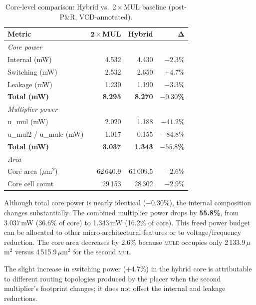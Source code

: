 \begin{table}[t]
  \caption{Core-level comparison: Hybrid vs.\ $2\!\times\!$MUL
           baseline (post-P\&R, VCD-annotated).}
  \label{tab:core_power}
  \centering
  \small
  \begin{tabular}{lrrr}
    \toprule
    \textbf{Metric} & $\boldsymbol{2\!\times\!}$\textbf{MUL} & \textbf{Hybrid} & $\boldsymbol{\Delta}$ \\
    \midrule
    \multicolumn{4}{l}{\emph{Core power}} \\
    \quad Internal (mW)  & 4.532 & 4.430 & $-2.3$\% \\
    \quad Switching (mW) & 2.532 & 2.650 & $+4.7$\% \\
    \quad Leakage (mW)   & 1.230 & 1.190 & $-3.3$\% \\
    \quad \textbf{Total (mW)} & \textbf{8.295} & \textbf{8.270} & $\boldsymbol{-0.30}$\textbf{\%} \\
    \midrule
    \multicolumn{4}{l}{\emph{Multiplier power}} \\
    \quad u\_mul (mW)     & 2.020 & 1.188 & $-41.2$\% \\
    \quad u\_mul2 / u\_mule (mW) & 1.017 & 0.155 & $-84.8$\% \\
    \quad \textbf{Total (mW)} & \textbf{3.037} & \textbf{1.343} & $\boldsymbol{-55.8}$\textbf{\%} \\
    \midrule
    \multicolumn{4}{l}{\emph{Area}} \\
    \quad Core area ($\mu$m$^{2}$)  & 62\,640.9 & 61\,009.5 & $-2.6$\% \\
    \quad Core cell count            & 29\,153   & 28\,302   & $-2.9$\% \\
    \bottomrule
  \end{tabular}
\end{table}

Although total core power is nearly identical ($-0.30$\%), the internal
composition changes substantially. The combined multiplier power drops
by \textbf{55.8\%}, from 3.037\,mW (36.6\% of core) to 1.343\,mW
(16.2\% of core). This freed power budget can be allocated to other
micro-architectural features or to voltage/frequency reduction.
The core area decreases by 2.6\% because \textsc{mule} occupies only
2\,133.9\,$\mu$m$^{2}$ versus 4\,515.9\,$\mu$m$^{2}$ for the second
\textsc{mul}.

The slight increase in switching power ($+4.7$\%) in the hybrid core
is attributable to different routing topologies produced by the placer
when the second multiplier's footprint changes; it does not offset the
internal and leakage reductions.

